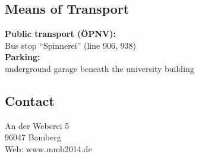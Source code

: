 \subsection{\textcolor{unibablueI}{Means of Transport}}
\textbf{\textcolor{unibablueII}{Public transport (ÖPNV):}}\\
Bus stop ``Spinnerei'' (line 906, 938)\\
\textbf{\textcolor{unibablueII}{Parking:}}\\
underground garage beneath the university building

\subsection{\textcolor{unibablueI}{Contact}}
An der Weberei 5\\
96047 Bamberg\\[2ex]
Web: www.mmb2014.de